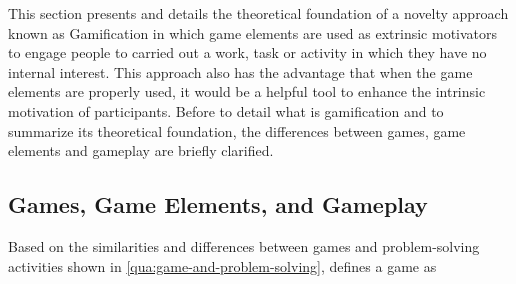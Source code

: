 This section presents and details the theoretical foundation of a novelty approach known as Gamification in which game elements are used as extrinsic motivators to engage people to carried out a work, task or activity in which they have no internal interest.
This approach also has the advantage that when the game elements are properly used, it would be a helpful tool to enhance the intrinsic motivation of participants.
Before to detail what is gamification and to summarize its theoretical foundation, the differences between games, game elements and gameplay are briefly clarified.


\subsection{Games, Game Elements, and Gameplay}

Based on the similarities and differences between games and problem-solving activities shown in \autoref{qua:game-and-problem-solving},  defines a game as   


